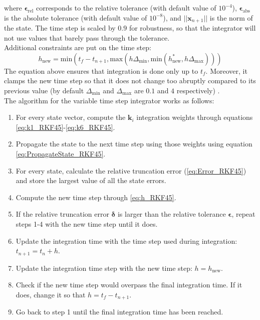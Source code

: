 where $\bm \epsilon_{\text{rel}}$ corresponds to the relative tolerance (with default value of $10^{-4}$), $\bm \epsilon_{\text{abs}}$ is the absolute tolerance (with default value of $10^{-8}$), and $||\bm x_{n+1}||$ is the norm of the state. The time step is scaled by $0.9$ for robustness, so that the integrator will not use values that barely pass through the tolerance.\\
Additional constraints are put on the time step:
\begin{equation}
	h_{\text{new}} = \text{min}\left( t_f - t_{n+1}, \text{max}\left(h\Delta_{\text{min}}, \text{min}\left(h_{\text{new}}^*, h\Delta_{\text{max}}\right) \right) \right)
\end{equation}
The equation above ensures that integration is done only up to $t_f$. Moreover, it clamps the new time step so that it does not change too abruptly compared to its previous value (by default $\Delta_{\text{min}}$ and $\Delta_{\text{max}}$ are $0.1$ and $4$ respectively) .\\
The algorithm for the variable time step integrator works as follows:
\begin{enumerate}
	\item For every state vector, compute the $\bm k_i$ integration weights through equations \ref{eq:k1_RKF45}-\ref{eq:k6_RKF45}.
	\item Propagate the state to the next time step using those weights using equation \ref{eq:PropagateState_RKF45}.
	\item For every state, calculate the relative truncation error (\ref{eq:Error_RKF45}) and store the largest value of all the state errors.
	\item Compute the new time step through \ref{eq:h_RKF45}.
	\item If the relative truncation error $\bm \delta$ is larger than the relative tolerance $\bm \epsilon$, repeat steps 1-4 with the new time step until it does.
	\item Update the integration time with the time step used during integration: $t_{n+1} = t_n + h$.
	\item Update the integration time step with the new time step: $h = h_{\text{new}}$.
	\item Check if the new time step would overpass the final integration time. If it does, change it so that $h = t_f - t_{n+1}$.
	\item Go back to step 1 until the final integration time has been reached.
\end{enumerate}

